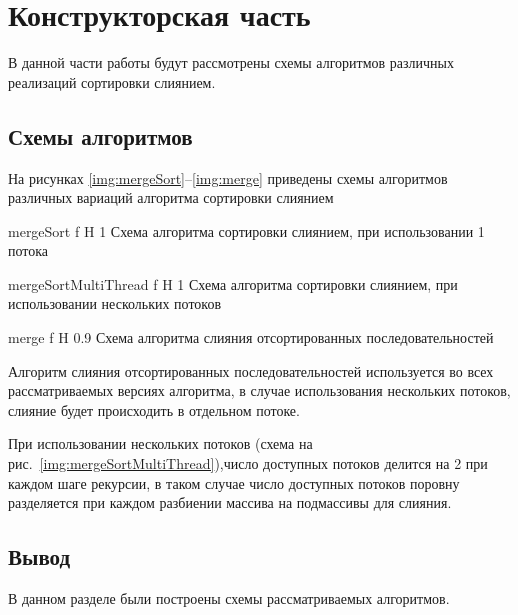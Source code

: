 \chapter{Конструкторская часть}
В данной части работы будут рассмотрены схемы алгоритмов различных реализаций сортировки слиянием.

\section{Схемы алгоритмов}

На рисунках \ref{img:mergeSort}--\ref{img:merge} приведены схемы алгоритмов различных вариаций алгоритма сортировки слиянием

{mergeSort} %
{f} %
{H} %
{1\textwidth} %
{Схема алгоритма сортировки слиянием, при использовании 1 потока} %

{mergeSortMultiThread} %
{f} %
{H} %
{1\textwidth} %
{Схема алгоритма сортировки слиянием, при использовании нескольких потоков} %

{merge} %
{f} %
{H} %
{0.9\textwidth} %
{Схема алгоритма слияния отсортированных последовательностей} %

\newpage

Алгоритм слияния отсортированных последовательностей используется во всех рассматриваемых версиях алгоритма, в случае использования нескольких потоков, слияние будет происходить в отдельном потоке.

При использовании нескольких потоков (схема на рис.~\ref{img:mergeSortMultiThread}),число доступных потоков делится на 2 при каждом шаге рекурсии, в таком случае число доступных потоков поровну разделяется при каждом разбиении массива на подмассивы для слияния.

\section*{Вывод}

В данном разделе  были построены схемы рассматриваемых алгоритмов.

